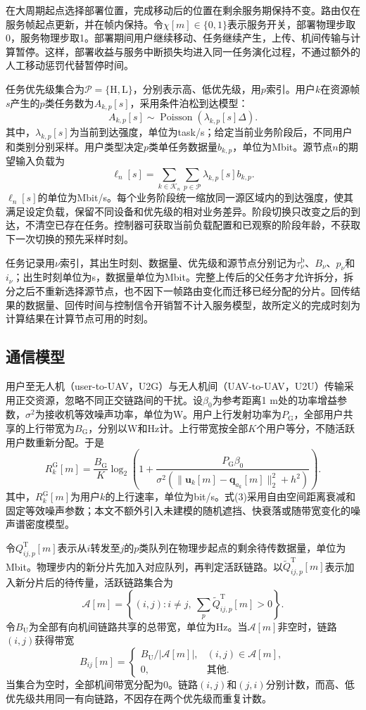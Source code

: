 在大周期起点选择部署位置，完成移动后的位置在剩余服务期保持不变。路由仅在服务帧起点更新，并在帧内保持。令$\chi[m]\in\{0,1\}$表示服务开关，部署物理步取0，服务物理步取1。部署期间用户继续移动、任务继续产生，上传、机间传输与计算暂停。这样，部署收益与服务中断损失均进入同一任务演化过程，不通过额外的人工移动惩罚代替暂停时间。

任务优先级集合为$\mathcal P=\{\mathrm H,\mathrm L\}$，分别表示高、低优先级，用$p$索引。用户$k$在资源帧$s$产生的$p$类任务数为$A_{k,p}[s]$，采用条件泊松到达模型：
\[
A_{k,p}[s]\sim\operatorname{Poisson}(\lambda_{k,p}[s]\Delta).\tag{1}
\]
其中，$\lambda_{k,p}[s]$为当前到达强度，单位为task/s；给定当前业务阶段后，不同用户和类别分别采样。用户类型决定$p$类单任务数据量$b_{k,p}$，单位为Mbit。源节点$n$的期望输入负载为
\[
\ell_n[s]=\sum_{k\in\mathcal K_n}\sum_{p\in\mathcal P}
 \lambda_{k,p}[s]b_{k,p}.\tag{2}
\]
$\ell_n[s]$的单位为Mbit/s。每个业务阶段统一缩放同一源区域内的到达强度，使其满足设定负载，保留不同设备和优先级的相对业务差异。阶段切换只改变之后的到达，不清空已存在任务。控制器可获取当前负载配置和已观察的阶段年龄，不获取下一次切换的预先采样时刻。

任务记录用$\nu$索引，其出生时刻、数据量、优先级和源节点分别记为$\tau_\nu^{\mathrm b}$、$B_\nu$、$p_\nu$和$i_\nu$；出生时刻单位为s，数据量单位为Mbit。完整上传后的父任务才允许拆分，拆分之后不重新选择源节点，也不因下一帧路由变化而迁移已经分配的分片。回传结果的数据量、回传时间与控制信令开销暂不计入服务模型，故所定义的完成时刻为计算结果在计算节点可用的时刻。

\subsection{通信模型}
用户至无人机（user-to-UAV，U2G）与无人机间（UAV-to-UAV，U2U）传输采用正交资源，忽略不同正交链路间的干扰。设$\beta_0$为参考距离1 m处的功率增益参数，$\sigma^2$为接收机等效噪声功率，单位为W。用户上行发射功率为$P_{\mathrm G}$，全部用户共享的上行带宽为$B_{\mathrm G}$，分别以W和Hz计。上行带宽按全部$K$个用户等分，不随活跃用户数重新分配。于是
\[
R_k^{\mathrm G}[m]=\frac{B_{\mathrm G}}{K}
 \log_2\!\left(1+
 \frac{P_{\mathrm G}\beta_0}
 {\sigma^2(\|\boldsymbol u_k[m]-\boldsymbol q_{a_k}[m]\|_2^2+h^2)}
 \right).\tag{3}
\]
其中，$R_k^{\mathrm G}[m]$为用户$k$的上行速率，单位为bit/s。式(3)采用自由空间距离衰减和固定等效噪声参数；本文不额外引入未建模的随机遮挡、快衰落或随带宽变化的噪声谱密度模型。

令$Q_{ij,p}^{\mathrm T}[m]$表示从$i$转发至$j$的$p$类队列在物理步起点的剩余待传数据量，单位为Mbit。物理步内的新分片先加入对应队列，再判定活跃链路。以$\widetilde Q_{ij,p}^{\mathrm T}[m]$表示加入新分片后的待传量，活跃链路集合为
\[
\mathcal A[m]=\left\{(i,j):i\ne j,\ 
 \sum_p\widetilde Q_{ij,p}^{\mathrm T}[m]>0\right\}.\tag{4}
\]
令$B_{\mathrm U}$为全部有向机间链路共享的总带宽，单位为Hz。当$\mathcal A[m]$非空时，链路$(i,j)$获得带宽
\[
B_{ij}[m]=
 \begin{cases}
 B_{\mathrm U}/|\mathcal A[m]|,&(i,j)\in\mathcal A[m],\\
 0,&\text{其他}.
 \end{cases}\tag{5}
\]
当集合为空时，全部机间带宽分配为0。链路$(i,j)$和$(j,i)$分别计数，而高、低优先级共用同一有向链路，不因存在两个优先级而重复计数。

